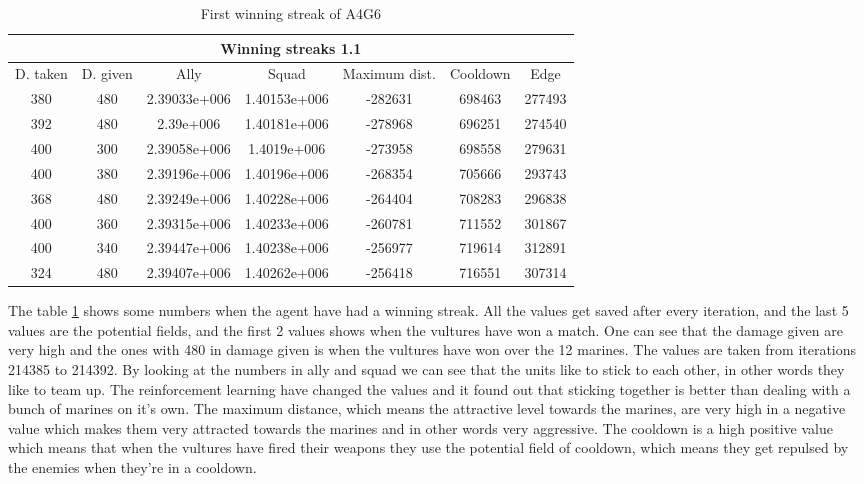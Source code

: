 
\begin{table}

 \begin{tabular}{|c||c|c|c|c|c|c|}
	\multicolumn{7}{c}{Winning streaks 1.1} \\
	\hline
	D. taken &			 D. given &		 Ally &		 Squad &		 Maximum dist. &		 Cooldown & 		Edge \\
	\hline
	380& 				 		480&						2.39033e+006&1.40153e+006&-282631&			698463&			277493\\
	392& 						480& 					2.39e+006&		1.40181e+006&-278968&			696251&			274540\\
	400& 						300& 					2.39058e+006&1.4019e+006&	-273958&			698558&			279631\\
	400& 						380& 					2.39196e+006&1.40196e+006&-268354&			705666&			293743\\
	368& 						480& 					2.39249e+006&1.40228e+006&-264404&			708283&			296838\\
	400& 						360& 					2.39315e+006&1.40233e+006&-260781&			711552&			301867\\
	400& 						340& 					2.39447e+006&1.40238e+006&-256977&			719614&			312891\\
	324& 						480&						2.39407e+006&1.40262e+006&-256418&			716551&			307314\\
	\hline

\end{tabular}
	\label{winning_streak_1.1}
	\caption{First winning streak of A4G6}
\end{table}
The table \ref{winning_streak_1.1} shows some numbers when the agent have had a winning streak. All the values get saved after every iteration, and the last 5 values are the potential fields, and the first 2 values shows when the vultures have won a match. One can see that the damage given are very high and the ones with 480 in damage given is when the vultures have won over the 12 marines. The values are taken from iterations 214385 to 214392. By looking at the numbers in ally and squad we can see that the units like to stick to each other, in other words they like to team up. The reinforcement learning have changed the values and it found out that sticking together is better than dealing with a bunch of marines on it's own. The maximum distance, which means the attractive level towards the marines, are very high in a negative value which makes them very attracted towards the marines and in other words very aggressive. The cooldown is a high positive value which means that when the vultures have fired their weapons they use the potential field of cooldown, which means they get repulsed by the enemies when they're in a cooldown. 







